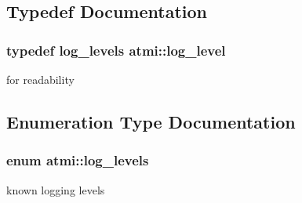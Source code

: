 \subsection{Typedef Documentation}
\hypertarget{group__logging_ga74d2cbe55d42a8a309e5535678fd9db3}{
\subsubsection[{log\+\_\+level}]{\setlength{\rightskip}{0pt plus 5cm}typedef log\+\_\+levels {\bf atmi\+::log\+\_\+level}}}\label{group__logging_ga74d2cbe55d42a8a309e5535678fd9db3}
for readability 

\subsection{Enumeration Type Documentation}
\hypertarget{group__logging_gaf9bdc466e66896621125b81d022264ca}{
\subsubsection[{log\+\_\+levels}]{\setlength{\rightskip}{0pt plus 5cm}enum {\bf atmi\+::log\+\_\+levels}}}\label{group__logging_gaf9bdc466e66896621125b81d022264ca}
known logging levels 